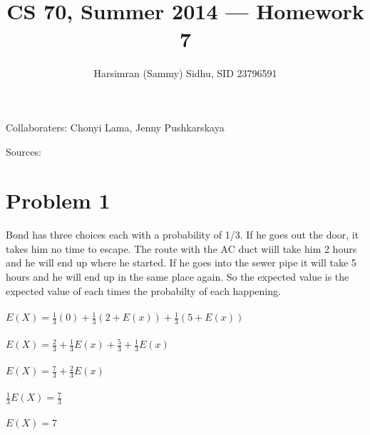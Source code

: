 \documentclass[11pt,letterpaper]{article}
\title{CS 70, Summer 2014 --- Homework 7} %
\author{Harsimran (Sammy) Sidhu, SID 23796591} %
\begin{document}
\maketitle

Collaboraters: Chonyi Lama, Jenny Pushkarskaya

Sources: 

\section*{Problem 1} %
Bond has three choices each with a probability of 1/3. If he goes out the door, it takes him no time to escape. The route with the AC duct wiill take him 2 hours and he will end up where he started. If he goes into the sewer pipe it will take 5 hours and he will end up in the same place again. So the expected value is the expected value of each times the probabilty of each happening.\\\\
$E(X) = \frac{1}{3}(0) + \frac{1}{3}(2 + E(x)) + \frac{1}{3}(5 + E(x))$\\\\
$E(X) =\frac{2}{3} + \frac{1}{3}E(x) + \frac{5}{3}+ \frac{1}{3}E(x)$\\\\
$E(X) =\frac{7}{3} + \frac{2}{3}E(x) $\\\\
$\frac{1}{3}E(X) =\frac{7}{3}$\\\\
$E(X) = 7$\\\\
\clearpage
\end{document}
